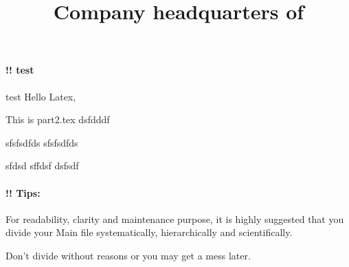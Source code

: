


\paragraph{!! test} test
Hello Latex, \par This is part2.tex dsfdddf

\indent sfsfsdfds sfsfsdfds

\indent
sfdsd sffdsf dsfsdf

\title{Company headquarters of}

\paragraph{!! Tips:}
For readability, clarity and maintenance purpose, it is highly suggested that you divide your
Main file systematically, hierarchically and scientifically.


Don't divide without reasons or you may get a mess later.

